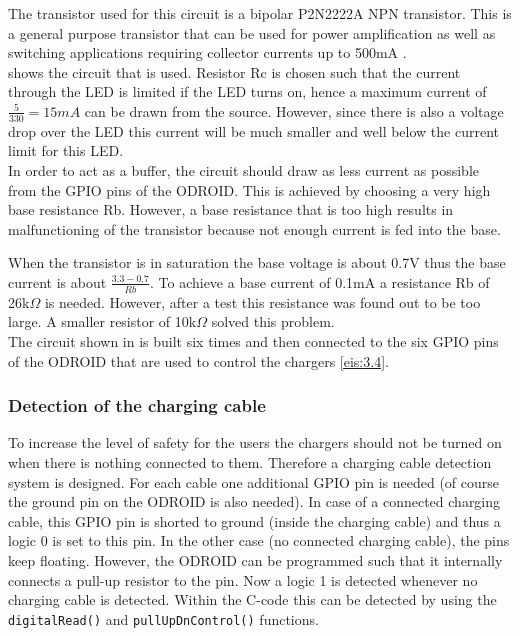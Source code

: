 The transistor used for this circuit is a bipolar P2N2222A NPN transistor. This is a general purpose transistor that can be used for power amplification as well as switching applications requiring collector currents up to 500mA \cite{p2n2222a}.\\

 shows the circuit that is used. Resistor Rc is chosen such that the current through the LED is limited if the LED turns on, hence a maximum current of $\frac{5}{330}=15mA$ can be drawn from the source. However, since there is also a voltage drop over the LED this current will be much smaller and well below the current limit for this LED.\\

In order to act as a buffer, the circuit should draw as less current as possible from the GPIO pins of the ODROID. This is achieved by choosing a very high base resistance Rb. However, a base resistance that is too high results in malfunctioning of the transistor because not enough current is fed into the base. 

When the transistor is in saturation the base voltage is about 0.7V thus the base current is about $\frac{3.3-0.7}{Rb}$. To achieve a base current of 0.1mA a resistance Rb of 26k$\Omega$ is needed. However, after a test this resistance was found out to be too large. A smaller resistor of 10k$\Omega$ solved this problem.\\

The circuit shown in  is built six times and then connected to the six GPIO pins of the ODROID that are used to control the chargers \ref{eis:3.4}.\\

\subsubsection{Detection of the charging cable}
To increase the level of safety for the users the chargers should not be turned on when there is nothing connected to them. Therefore a charging cable detection system is designed. For each cable one additional GPIO pin is needed (of course the ground pin on the ODROID is also needed). In case of a connected charging cable, this GPIO pin is shorted to ground (inside the charging cable) and thus a logic 0 is set to this pin. In the other case (no connected charging cable), the pins keep floating. However, the ODROID can be programmed such that it internally connects a pull-up resistor to the pin. Now a logic 1 is detected whenever no charging cable is detected. Within the C-code this can be detected by using the \verb|digitalRead()| and \verb|pullUpDnControl()| functions.\\

